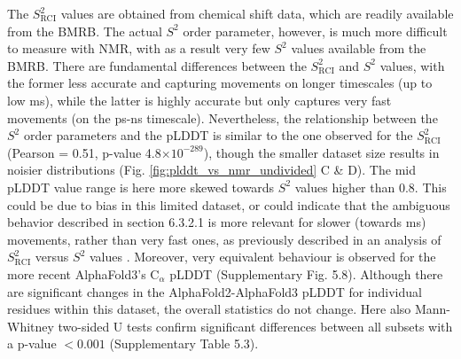 The $S^{2}_{\text{RCI}}$ values are obtained from chemical shift data, which are readily available from the BMRB. The actual $S^{2}$ order parameter, however, is much more difficult to measure with NMR, with as a result very few $S^{2}$ values available from the BMRB. There are fundamental differences between the $S^{2}_{\text{RCI}}$ and $S^{2}$ values, with the former less accurate and capturing movements on longer timescales (up to low ms), while the latter is highly accurate but only captures very fast movements (on the ps-ns timescale). Nevertheless, the relationship between the $S^{2}$ order parameters and the pLDDT is similar to the one observed for the $S^{2}_{\text{RCI}}$ (Pearson = 0.51, p-value  4.8$\times 10^{-289}$), though the smaller dataset size results in noisier distributions (Fig. \ref{fig:plddt_vs_nmr_undivided} C \& D). The mid pLDDT value range is here more skewed towards $S^{2}$ values higher than 0.8. This could be due to bias in this limited dataset, or could indicate that the ambiguous behavior described in section 6.3.2.1 is more relevant for slower (towards ms) movements, rather than very fast ones, as previously described in an analysis of $S^{2}_{\text{RCI}}$ versus $S^{2}$ values \cite{cilia_protein_2013}. Moreover, very equivalent behaviour is observed for the more recent AlphaFold3's C$_\alpha$ pLDDT (Supplementary Fig. 5.8).
Although there are significant changes in the AlphaFold2-AlphaFold3 pLDDT for individual residues within this dataset, the overall statistics do not change. Here also Mann-Whitney two-sided U tests confirm significant differences between all subsets with a p-value \( < 0.001 \) (Supplementary Table 5.3).

